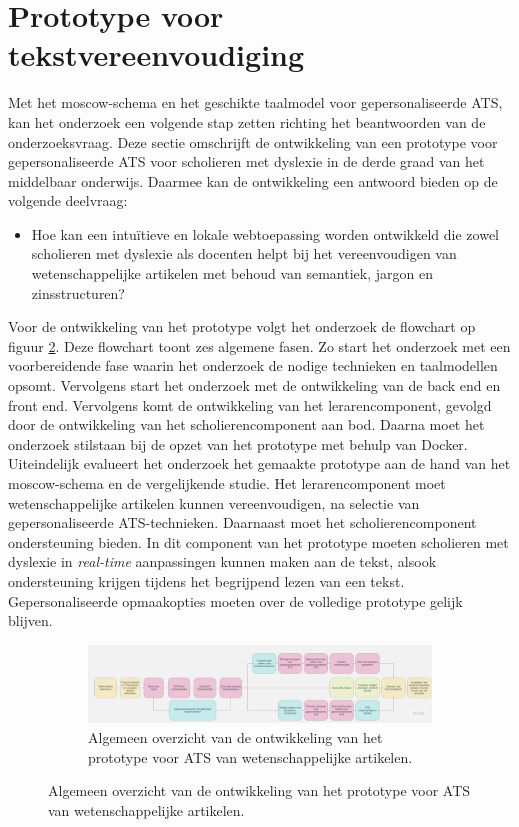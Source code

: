 \section{Prototype voor tekstvereenvoudiging}

Met het moscow-schema en het geschikte taalmodel voor gepersonaliseerde ATS, kan het onderzoek een volgende stap zetten richting het beantwoorden van de onderzoeksvraag. Deze sectie omschrijft de ontwikkeling van een prototype voor gepersonaliseerde ATS voor scholieren met dyslexie in de derde graad van het middelbaar onderwijs. Daarmee kan de ontwikkeling een antwoord bieden op de volgende deelvraag: 

\begin{itemize}
	\item Hoe kan een intuïtieve en lokale webtoepassing worden ontwikkeld die zowel scholieren met dyslexie als docenten helpt bij het vereenvoudigen van wetenschappelijke artikelen met behoud van semantiek, jargon en zinsstructuren?
\end{itemize}

Voor de ontwikkeling van het prototype volgt het onderzoek de flowchart op figuur \ref{img:general-overview-prototype}. Deze flowchart toont zes algemene fasen. Zo start het onderzoek met een voorbereidende fase waarin het onderzoek de nodige technieken en taalmodellen opsomt. Vervolgens start het onderzoek met de ontwikkeling van de back end en front end. Vervolgens komt de ontwikkeling van het lerarencomponent, gevolgd door de ontwikkeling van het scholierencomponent aan bod. Daarna moet het onderzoek stilstaan bij de opzet van het prototype met behulp van Docker. Uiteindelijk evalueert het onderzoek het gemaakte prototype aan de hand van het moscow-schema en de vergelijkende studie. Het lerarencomponent moet wetenschappelijke artikelen kunnen vereenvoudigen, na selectie van gepersonaliseerde ATS-technieken. Daarnaast moet het scholierencomponent ondersteuning bieden. In dit component van het prototype moeten scholieren met dyslexie in \textit{real-time} aanpassingen kunnen maken aan de tekst, alsook ondersteuning krijgen tijdens het begrijpend lezen van een tekst. Gepersonaliseerde opmaakopties moeten over de volledige prototype gelijk blijven.


\begin{figure}
	\begin{figure}[H]
		\includegraphics[width=\linewidth]{img/flowchart-general-development.jpg}
		\caption{Algemeen overzicht van de ontwikkeling van het prototype voor ATS van wetenschappelijke artikelen.}
		\label{img:general-overview-prototype}
	\end{figure}
\end{figure}

